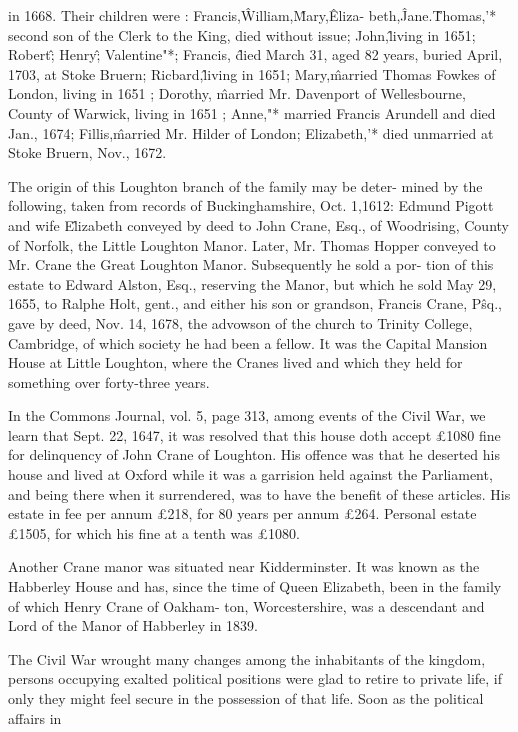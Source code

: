 in 1668. Their children were : Francis,\^ William,\^ Mary,\^ Eliza- 
beth,\^ Jane.\^ Thomas,'* second son of the Clerk to the King, 
died without issue; John,\^ living in 1651; Robert\^ ; Henry\^ ; 
Valentine"*; Francis, \^ died March 31, aged 82 years, buried 
April, 1703, at Stoke Bruern; Ricbard,\^ living in 1651; Mary,\^ 
married Thomas Fowkes of London, living in 1651 ; Dorothy, \^ 
married Mr. Davenport of Wellesbourne, County of Warwick, 
living in 1651 ; Anne,"* married Francis Arundell and died Jan., 
1674; Fillis,\^ married Mr. Hilder of London; Elizabeth,'* died 
unmarried at Stoke Bruern, Nov., 1672. 

The origin of this Loughton branch of the family may be deter- 
mined by the following, taken from records of Buckinghamshire, 
Oct. 1,1612: Edmund Pigott and wife E\^lizabeth conveyed by deed 
to John Crane, Esq., of Woodrising, County of Norfolk, the Little 
Loughton Manor. Later, Mr. Thomas Hopper conveyed to Mr. 
Crane the Great Loughton Manor. Subsequently he sold a por- 
tion of this estate to Edward Alston, Esq., reserving the Manor, 
but which he sold May 29, 1655, to Ralphe Holt, gent., and 
either his son or grandson, Francis Crane, P\^sq., gave by deed, 
Nov. 14, 1678, the advowson of the church to Trinity College, 
Cambridge, of which society he had been a fellow. It was the 
Capital Mansion House at Little Loughton, where the Cranes 
lived and which they held for something over forty-three years. 

In the Commons Journal, vol. 5, page 313, among events of the 
Civil War, we learn that Sept. 22, 1647, it was resolved that this 
house doth accept £1080 fine for delinquency of John Crane of 
Loughton. His offence was that he deserted his house and lived 
at Oxford while it was a garrision held against the Parliament, 
and being there when it surrendered, was to have the benefit of 
these articles. His estate in fee per annum £218, for 80 years 
per annum £264. Personal estate £1505, for which his fine at a 
tenth was £1080. 

Another Crane manor was situated near Kidderminster. It was 
known as the Habberley House and has, since the time of Queen 
Elizabeth, been in the family of which Henry Crane of Oakham- 
ton, Worcestershire, was a descendant and Lord of the Manor of 
Habberley in 1839. 

The Civil War wrought many changes among the inhabitants 
of the kingdom, persons occupying exalted political positions 
were glad to retire to private life, if only they might feel secure 
in the possession of that life. Soon as the political affairs in 



